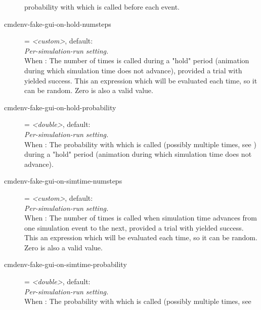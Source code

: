 \begin{description}
    probability with which  is called before each
    event.
\item[cmdenv-fake-gui-on-hold-numsteps] = \textit{<custom>}, default: \\
    \textit{Per-simulation-run setting.}\\
    When : The
    number of times  is called during a "hold" period
    (animation during which simulation time does not advance), provided a trial
    with
    yielded success. This an expression which will be evaluated each time, so
    it can be random. Zero is also a valid value.
\item[cmdenv-fake-gui-on-hold-probability] = \textit{<double>}, default: \\
    \textit{Per-simulation-run setting.}\\
    When : The
    probability with which  is called (possibly
    multiple times, see
    )
    during a "hold" period (animation during which simulation time does not
    advance).
\item[cmdenv-fake-gui-on-simtime-numsteps] = \textit{<custom>}, default: \\
    \textit{Per-simulation-run setting.}\\
    When : The
    number of times  is called when simulation time
    advances from one simulation event to the next, provided a trial with
    yielded success. This an expression which will be evaluated each time, so
    it can be random. Zero is also a valid value.
\item[cmdenv-fake-gui-on-simtime-probability] = \textit{<double>}, default: \\
    \textit{Per-simulation-run setting.}\\
    When : The
    probability with which  is called (possibly
    multiple times, see

\end{description}
